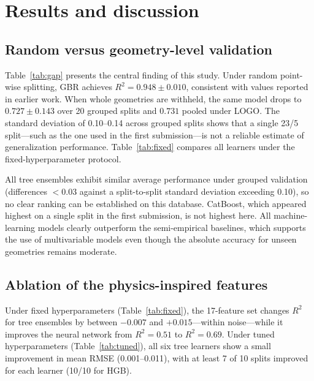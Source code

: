 \documentclass[12pt]{article}
\begin{document}
\section{Results and discussion}

\subsection{Random versus geometry-level validation}
Table~\ref{tab:gap} presents the central finding of this study. Under random point-wise splitting, GBR achieves $R^2 = 0.948 \pm 0.010$, consistent with values reported in earlier work. When whole geometries are withheld, the same model drops to $0.727 \pm 0.143$ over 20 grouped splits and $0.731$ pooled under LOGO. The standard deviation of 0.10--0.14 across grouped splits shows that a single 23/5 split---such as the one used in the first submission---is not a reliable estimate of generalization performance. Table~\ref{tab:fixed} compares all learners under the fixed-hyperparameter protocol.

\begin{table}[!ht]\centering\caption{Accuracy under three validation schemes.}\label{tab:gap}\end{table}
\begin{table}[!ht]\centering\caption{20 repeated geometry-grouped 23/5 splits, fixed hyperparameters (mean$\pm$sd of $R^2$; mean RMSE).}\label{tab:fixed}\end{table}

All tree ensembles exhibit similar average performance under grouped validation (differences $<0.03$ against a split-to-split standard deviation exceeding 0.10), so no clear ranking can be established on this database. CatBoost, which appeared highest on a single split in the first submission, is not highest here. All machine-learning models clearly outperform the semi-empirical baselines, which supports the use of multivariable models even though the absolute accuracy for unseen geometries remains moderate.

\subsection{Ablation of the physics-inspired features}
\label{sec:ablation}

Under fixed hyperparameters (Table~\ref{tab:fixed}), the 17-feature set changes $R^2$ for tree ensembles by between $-0.007$ and $+0.015$---within noise---while it improves the neural network from $R^2=0.51$ to $R^2=0.69$. Under tuned hyperparameters (Table~\ref{tab:tuned}), all six tree learners show a small improvement in mean RMSE (0.001--0.011), with at least 7 of 10 splits improved for each learner (10/10 for HGB).
\end{document}
